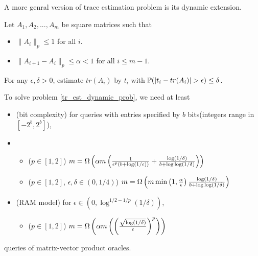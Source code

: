 A more genral version of trace estimation problem is its dynamic extension.
\begin{prob}
\label{tr_est_dynamic_prob}
Let $A_1,A_2,...,A_m$ be square matrices such that
\begin{itemize}
    \item $\|A_i\|_p\le 1$ for all $i$.
    \item $\|A_{i+1}-A_i\|_p\le\alpha<1$ for all $i\le m-1$.
\end{itemize}
For any $\epsilon,\delta>0$, estimate $tr(A_i)$ by $t_i$ with $\mb P(|t_i-tr(A_i)|>\epsilon)\le\delta$.
\end{prob}

\begin{cor}
\label{tr_est_dynamic}
To solve problem \ref{tr_est_dynamic_prob}, we need at least
\begin{itemize}
    \item (bit complexity) for queries with entries specified by $b$ bits(integers range in $[-2^b,2^b]$),
    \item \begin{itemize}
        \item ($p\in[1,2]$) $m=\Omega\left(\alpha m\left(\frac{1}{\epsilon^p(b+\log(1/\epsilon))}+\frac{\log(1/\delta)}{b+\log\log(1/\delta)}\right)\right)$ 
        \item ($p\in[1,2]$, $\epsilon,\delta\in(0,1/4)$) $m=\Omega\left(m\min\left(1,\frac{\alpha}{\epsilon}\right)\frac{\log(1/\delta)}{b+\log\log(1/\delta)}\right)$
    \end{itemize}
    \item (RAM model) for $\epsilon\in(0,\log^{1/2-1/p}(1/\delta))$,
    \begin{itemize}
        \item ($p\in[1,2]$) $m=\Omega\left(\alpha m\left(\left(\frac{\sqrt{\log(1/\delta)}}{\epsilon}\right)^p\right)\right)$
    \end{itemize}   
\end{itemize}
queries of matrix-vector product oracles.
\end{cor}

